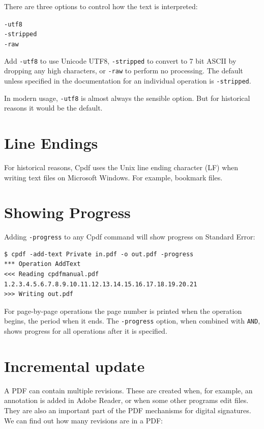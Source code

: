 \documentclass{book}
\begin{document}
\noindent There are three options to control how the text is interpreted:

\begin{framed}
  \noindent\small\verb!-utf8!\\
  \noindent\small\verb!-stripped!\\
  \noindent\small\verb!-raw!
\end{framed}

\noindent Add \verb!-utf8! to use Unicode UTF8, \verb!-stripped! to convert to 7
bit ASCII by dropping any high characters, or \verb!-raw! to perform no
processing. The default unless specified in the documentation for an individual operation is \verb!-stripped!.

In modern usage, \texttt{-utf8} is almost always the sensible option. But for historical reasons it would be the default.

\section{Line Endings}

For historical reasons, Cpdf uses the Unix line ending character (LF) when writing text files on Microsoft Windows. For example, bookmark files.

\section{Showing Progress}

Adding \texttt{-progress} to any Cpdf command will show progress on Standard Error:

{\small\begin{verbatim}
$ cpdf -add-text Private in.pdf -o out.pdf -progress
*** Operation AddText
<<< Reading cpdfmanual.pdf
1.2.3.4.5.6.7.8.9.10.11.12.13.14.15.16.17.18.19.20.21
>>> Writing out.pdf
\end{verbatim}}

\noindent For page-by-page operations the page number is printed when the operation begins, the period when it ends. The \texttt{-progress} option, when combined with \texttt{AND}, shows progress for all operations after it is specified.

\section{Incremental update}

A PDF can contain multiple revisions. These are created when, for example, an annotation is added in Adobe Reader, or when some other programs edit files. They are also an important part of the PDF mechanisms for digital signatures. We can find out how many revisions are in a PDF:
\end{document}
